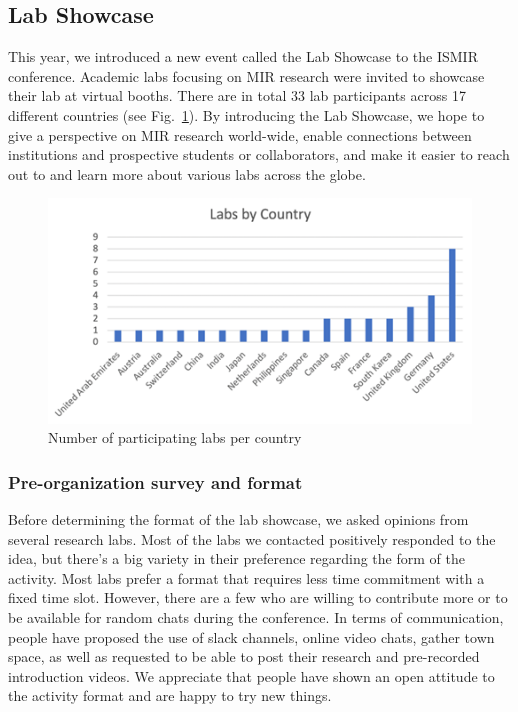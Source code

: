 \documentclass[%
10pt,								%
]
{scrartcl}
\begin{document}
    \subsection{Lab Showcase}
        This year, we introduced a new event called the Lab Showcase to the ISMIR conference. Academic labs focusing on MIR research were invited to showcase their lab at virtual booths. There are in total 33 lab participants across 17 different countries (see Fig.~\ref{fig:labshowcase_country}). By introducing the Lab Showcase, we hope to give a perspective on MIR research world-wide, enable connections between institutions and prospective students or collaborators, and make it easier to reach out to and learn more about various labs across the globe.
        \begin{figure}%
            \includegraphics[width=\columnwidth]{fig/labshowcase_country}%
            \caption{Number of participating labs per country}%
            \label{fig:labshowcase_country}%
        \end{figure}
        
        \subsubsection{Pre-organization survey and format}
            Before determining the format of the lab showcase, we asked opinions from several research labs. Most of the labs we contacted positively responded to the idea, but there’s a big variety in their preference regarding the form of the activity. Most labs prefer a format that requires less time commitment with a fixed time slot. However, there are a few who are willing to contribute more or to be available for random chats during the conference. In terms of communication, people have proposed the use of slack channels, online video chats, gather town space, as well as requested to be able to post their research and pre-recorded introduction videos. We appreciate that people have shown an open attitude to the activity format and are happy to try new things.
            
\end{document}
